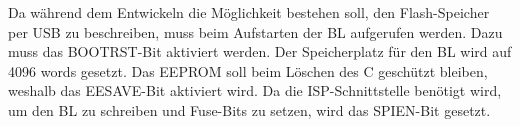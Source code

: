 Da während dem Entwickeln die Möglichkeit bestehen soll, den Flash-Speicher per USB zu beschreiben, muss beim Aufstarten der BL aufgerufen werden. Dazu muss das BOOTRST-Bit aktiviert werden. Der Speicherplatz für den BL wird auf 4096 words gesetzt. Das EEPROM soll beim Löschen des \textmu C geschützt bleiben, weshalb das EESAVE-Bit aktiviert wird. Da die ISP-Schnittstelle benötigt wird, um den BL zu schreiben und Fuse-Bits zu setzen, wird das SPIEN-Bit gesetzt.
%
%
%
%
%
%
%
%
%
%
%
%
%
%
%
%
%
%
